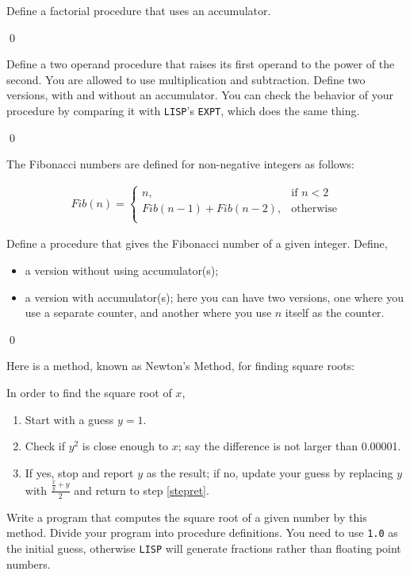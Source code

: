 \documentclass[a4paper,11pt]{article}
\begin{document}
\begin{uexercise}

Define a factorial procedure that uses an accumulator.

\qed
\end{uexercise}

\begin{uexercise}
Define a two operand procedure that raises its first operand to the power of the second. You are allowed to use multiplication and subtraction. Define two versions, with and without an accumulator. You can check the behavior of your procedure by comparing it with \Verb+LISP+'s \Verb+EXPT+, which does the same thing. 
 
\qed
\end{uexercise}

\begin{uexercise}

The Fibonacci numbers are defined for non-negative integers as follows:

\begin{align}
Fib(n) =  
\begin{cases}
n, & \text{if }n < 2 \\
Fib(n - 1) + Fib(n-2), & \text{otherwise} \\
\end{cases}
\end{align}

Define a procedure that gives the Fibonacci number of a given integer. Define,

\begin{itemize}
\item a version without using accumulator(s);
\item a version with accumulator(s); here you can have two versions, one where you use a separate counter, and another where you use $n$ itself as the counter.
\end{itemize}

\qed
\end{uexercise}

\begin{uexercise}

Here is a method, known as Newton's Method, for finding square roots:  

In order to find the square root of $x$,

\begin{enumerate}
\item Start with a guess $y=1$.
\item\label{stepret} Check if $y^2$ is close enough to $x$; say the difference is not larger than 0.00001.
\item If yes, stop and report $y$ as the result; if no, update your guess by replacing $y$ with $\frac{\frac{x}{y} + y}{2}$ and return to step \ref{stepret}. 
\end{enumerate}

Write a program that computes the square root of a given number by this method. Divide your program into procedure definitions. You need to use \Verb+1.0+ as the initial guess, otherwise \Verb+LISP+ will generate fractions rather than floating point numbers. 

\end{uexercise}
\end{document}
